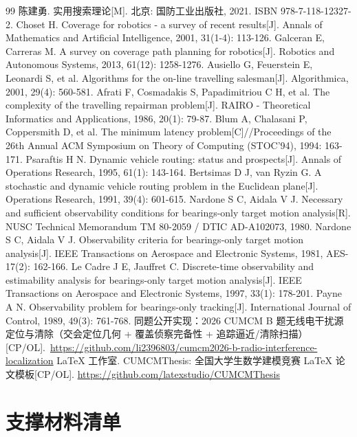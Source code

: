 \documentclass{cumcmthesis}
\begin{document}
\begin{thebibliography}{99}
 陈建勇. 实用搜索理论[M]. 北京: 国防工业出版社, 2021. ISBN 978-7-118-12327-2.
 Choset H. Coverage for robotics - a survey of recent results[J]. Annals of Mathematics and Artificial Intelligence, 2001, 31(1-4): 113-126.
 Galceran E, Carreras M. A survey on coverage path planning for robotics[J]. Robotics and Autonomous Systems, 2013, 61(12): 1258-1276.
 Ausiello G, Feuerstein E, Leonardi S, et al. Algorithms for the on-line travelling salesman[J]. Algorithmica, 2001, 29(4): 560-581.
 Afrati F, Cosmadakis S, Papadimitriou C H, et al. The complexity of the travelling repairman problem[J]. RAIRO - Theoretical Informatics and Applications, 1986, 20(1): 79-87.
 Blum A, Chalasani P, Coppersmith D, et al. The minimum latency problem[C]//Proceedings of the 26th Annual ACM Symposium on Theory of Computing (STOC'94), 1994: 163-171.
 Psaraftis H N. Dynamic vehicle routing: status and prospects[J]. Annals of Operations Research, 1995, 61(1): 143-164.
 Bertsimas D J, van Ryzin G. A stochastic and dynamic vehicle routing problem in the Euclidean plane[J]. Operations Research, 1991, 39(4): 601-615.
 Nardone S C, Aidala V J. Necessary and sufficient observability conditions for bearings-only target motion analysis[R]. NUSC Technical Memorandum TM 80-2059 / DTIC AD-A102073, 1980.
 Nardone S C, Aidala V J. Observability criteria for bearings-only target motion analysis[J]. IEEE Transactions on Aerospace and Electronic Systems, 1981, AES-17(2): 162-166.
 Le Cadre J E, Jauffret C. Discrete-time observability and estimability analysis for bearings-only target motion analysis[J]. IEEE Transactions on Aerospace and Electronic Systems, 1997, 33(1): 178-201.
 Payne A N. Observability problem for bearings-only tracking[J]. International Journal of Control, 1989, 49(3): 761-768.
 同题公开实现：2026 CUMCM B 题无线电干扰源定位与清除（交会定位几何 + 覆盖侦察完备性 + 追踪逼近/清除扫描）[CP/OL].\
\url{https://github.com/li2396803/cumcm2026-b-radio-interference-localization}
\bibitem{cumcmthesis} LaTeX 工作室. CUMCMThesis: 全国大学生数学建模竞赛 LaTeX 论文模板[CP/OL]. \url{https://github.com/latexstudio/CUMCMThesis}
\end{thebibliography}

\appendix
\section{支撑材料清单}
\end{document}
